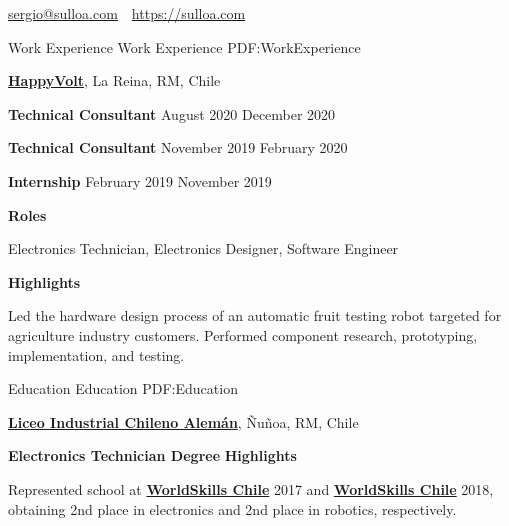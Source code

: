 \documentclass[letterpaper,yyyy,draft]{simpleresumecv}
\newcommand{\CVAuthor}{Sergio A. Ulloa B.}
\newcommand{\CVWebpage}{https://sulloa.com}
\begin{document}
\makeatletter
\let\@oddfoot\@empty{}
\let\@evenfoot\@empty{}
\makeatother

\Title{\CVAuthor}

{
    \begin{SubTitle}
    \href{mailto:sergio@sulloa.com}{sergio@sulloa.com}
    \,\SubBulletSymbol\,
    \href{\CVWebpage}{\url{\CVWebpage}}
    \end{SubTitle}
}

\begin{Body}


\Section
{Work\newline
Experience}
{Work Experience}
{PDF:WorkExperience}
{
    \Entry{}
    \href{https://happyvolt.com/}{\textbf{HappyVolt}},
    La Reina, RM, Chile

    \BulletItem{}
    \textbf{Technical Consultant}
    \hfill
    August 2020
    December 2020

    \Gap{}
    \BulletItem{}
    \textbf{Technical Consultant}
    \hfill
    November 2019
    February 2020

    \Gap{}
    \BulletItem{}
    \textbf{Internship}
    \hfill
    February 2019
    November 2019

    \Gap{}
    \BulletItem{}
    \textbf{Roles}
    \hfill
    \begin{Detail}
    \SubBulletItem{}
    Electronics Technician, Electronics Designer, Software Engineer  
    \end{Detail}

    \Gap{}
    \BulletItem{}
    \textbf{Highlights}
    \hfill
    \begin{Detail}
    \SubBulletItem{}
    Led the hardware design process of an automatic fruit testing robot targeted for agriculture industry customers. Performed component research, prototyping, implementation, and testing.
    \end{Detail}
}


\Section
{Education}
{Education}
{PDF:Education}
{
    \Entry{}
    \href{https://www.lichan.cl/}{\textbf{Liceo Industrial Chileno Alemán}},
    Ñuñoa, RM, Chile
    \hfill
     \-\- 

    \Gap{}
    \BulletItem{}
    \textbf{Electronics Technician Degree}
    \Gap{}
    \BulletItem{}
    \textbf{Highlights}
    \begin{Detail}
    \SubBulletItem{}
    Represented school at \href{https://worldskills.org/}{\textbf{WorldSkills Chile}} 2017 and \href{https://worldskills.org/}{\textbf{WorldSkills Chile}} 2018, obtaining 2nd place in electronics and 2nd place in robotics, respectively.
    \end{Detail}
}


\end{Body}
\end{document}
